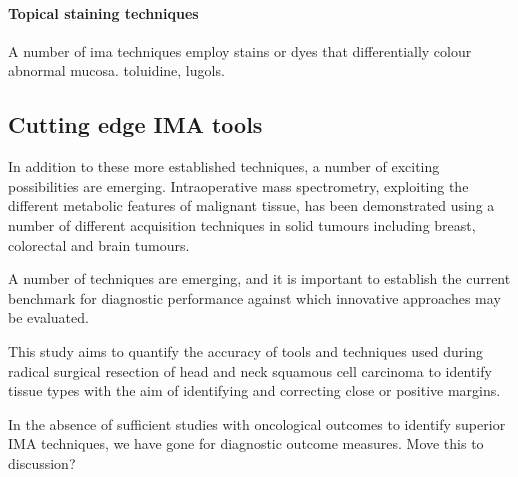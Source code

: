 \paragraph{Topical staining techniques}
A number of \gls{ima} techniques employ stains or dyes that differentially colour abnormal mucosa.
toluidine, lugols.


\subsection{Cutting edge IMA tools}
In addition to these more established techniques, a number of exciting possibilities are emerging. 
Intraoperative mass spectrometry, exploiting the different metabolic features of malignant tissue, has been demonstrated using a number of different acquisition techniques in solid tumours including breast, colorectal and brain tumours.

A number of techniques are emerging, and it is important to establish the current benchmark for diagnostic performance against which innovative approaches may be evaluated.

This study aims to quantify the accuracy of tools and techniques used during radical surgical resection of head and neck squamous cell carcinoma to identify tissue types with the aim of identifying and correcting close or positive margins.

In the absence of sufficient studies with oncological outcomes to identify superior IMA techniques, we have gone for diagnostic outcome measures. Move this to discussion?
